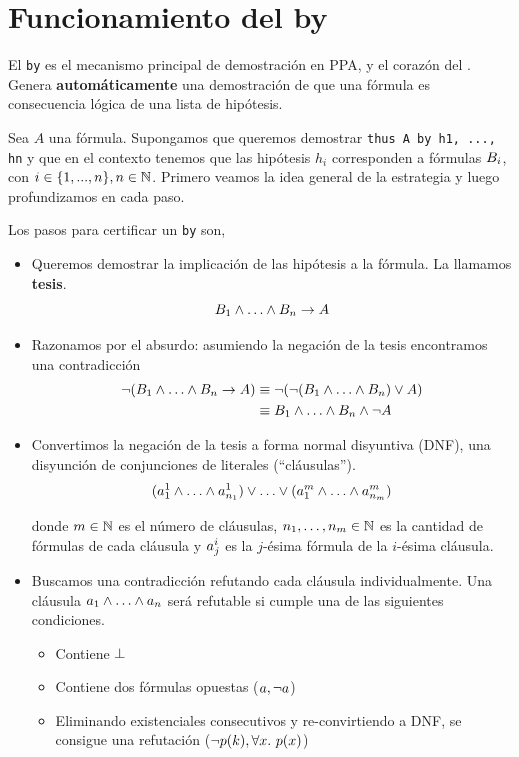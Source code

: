\section{Funcionamiento del by}

El \lstinline{by} es el mecanismo principal de demostración en PPA, y el corazón del \modCertifier. Genera
\textbf{automáticamente} una demostración de que una fórmula es consecuencia lógica de
una lista de hipótesis.

Sea $A$ una fórmula. Supongamos que queremos demostrar \lstinline{thus A by h1, ..., hn} y que en el contexto tenemos que las hipótesis $h_i$ corresponden a
fórmulas $B_i$, con $i \in \{1, ..., n\}, n \in \mathbb{N}$. Primero
veamos la idea general de la estrategia y luego profundizamos en cada paso.

Los pasos para certificar un \lstinline{by} son,

\begin{itemize}
    \item Queremos demostrar la implicación de las hipótesis a la fórmula. La
    llamamos \textbf{tesis}.
    \[
        \formTwo_1 \fAnd \dots \fAnd \formTwo_n \fImp \form
    \]
    \item Razonamos por el absurdo: asumiendo la negación de la tesis encontramos una contradicción
    \begin{align*}
        \fNot (\formTwo_1 \fAnd \dots \fAnd \formTwo_n \fImp \form)
        &\equiv \fNot (\fNot (\formTwo_1 \fAnd \dots \fAnd \formTwo_n) \fOr \form)\\
        &\equiv \formTwo_1 \fAnd \dots \fAnd \formTwo_n \fAnd \fNot \form
    \end{align*}
    \item Convertimos la negación de la tesis a forma normal disyuntiva (DNF),
    una disyunción de conjunciones de literales (``cláusulas'').
    \[
        (\formLit^1_{1} \fAnd \dots \fAnd \formLit^1_{n_1})
        \fOr \dots \fOr
        (\formLit^m_{1} \fAnd \dots \fAnd \formLit^m_{n_m})
    \]

    donde $m \in \mathbb{N}$ es el número de cláusulas, $n_1, \dots, n_m \in
    \mathbb{N}$ es la cantidad de fórmulas de cada cláusula y $a^i_j$
    es la $j$-ésima fórmula de la $i$-ésima cláusula.
    \item Buscamos una contradicción refutando cada cláusula individualmente.
    Una cláusula $\formLit_1 \fAnd \dots \fAnd \formLit_n$ será refutable si
    cumple una de las siguientes condiciones.
    \begin{itemize}
        \item Contiene $\bot$
        \item Contiene dos fórmulas opuestas ($a, \neg a$)
        \item Eliminando existenciales consecutivos y re-convirtiendo a DNF, se
        consigue una refutación ($\neg p(k), \forall x .\ p(x)$)
    \end{itemize}
\end{itemize}

